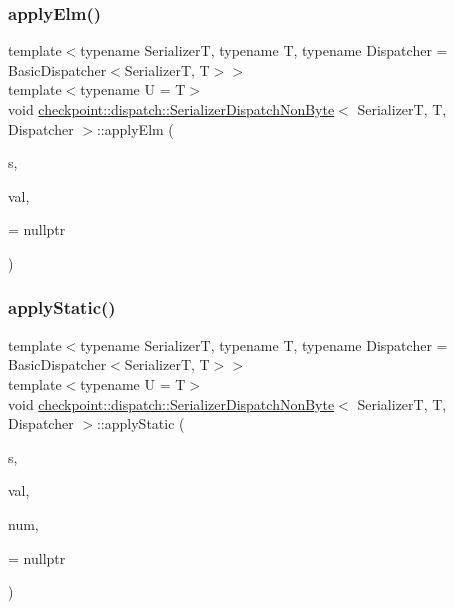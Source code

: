 \subsubsection{\texorpdfstring{apply\+Elm()}{applyElm()}\hspace{0.1cm}{\footnotesize\ttfamily [3/3]}}
{\footnotesize\ttfamily template$<$typename SerializerT, typename T, typename Dispatcher = Basic\+Dispatcher$<$\+Serializer\+T, T$>$$>$ \\
template$<$typename U  = T$>$ \\
void \hyperlink{structcheckpoint_1_1dispatch_1_1_serializer_dispatch_non_byte}{checkpoint\+::dispatch\+::\+Serializer\+Dispatch\+Non\+Byte}$<$ SerializerT, T, Dispatcher $>$\+::apply\+Elm (\begin{DoxyParamCaption}\item[{SerializerT \&}]{s,  }\item[{T $\ast$}]{val,  }\item[{is\+Enum$<$ U $>$ $\ast$}]{ = {\ttfamily nullptr} }\end{DoxyParamCaption})\hspace{0.3cm}{\ttfamily [inline]}}

\mbox{\label{structcheckpoint_1_1dispatch_1_1_serializer_dispatch_non_byte_a5c76cadd528c3d2348a3963d44402aea}} 
\subsubsection{\texorpdfstring{apply\+Static()}{applyStatic()}\hspace{0.1cm}{\footnotesize\ttfamily [1/3]}}
{\footnotesize\ttfamily template$<$typename SerializerT, typename T, typename Dispatcher = Basic\+Dispatcher$<$\+Serializer\+T, T$>$$>$ \\
template$<$typename U  = T$>$ \\
void \hyperlink{structcheckpoint_1_1dispatch_1_1_serializer_dispatch_non_byte}{checkpoint\+::dispatch\+::\+Serializer\+Dispatch\+Non\+Byte}$<$ SerializerT, T, Dispatcher $>$\+::apply\+Static (\begin{DoxyParamCaption}\item[{SerializerT \&}]{s,  }\item[{T $\ast$}]{val,  }\item[{\hyperlink{namespacecheckpoint_a083f6674da3f94c2901b18c6d238217c}{Serial\+Size\+Type}}]{num,  }\item[{\hyperlink{structcheckpoint_1_1dispatch_1_1_serializer_dispatch_non_byte_a7f2203710503e6ea7a5c4a565795a1d0}{has\+In\+Serialize}$<$ U $>$ $\ast$}]{ = {\ttfamily nullptr} }\end{DoxyParamCaption})\hspace{0.3cm}{\ttfamily [inline]}}

